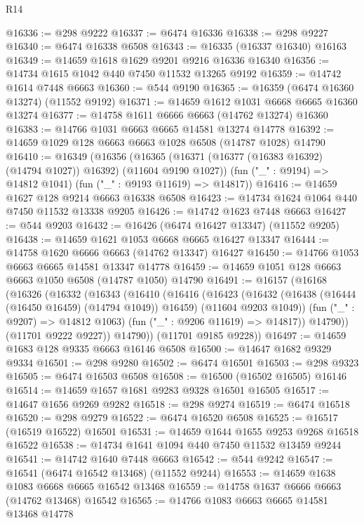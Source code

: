 \begin{lexlean}{R14}
\begin{coremodule}
{{{{{{{{{{{{{{{{{{{{{{{{{{{{{{{{{{{{{{{{{{{{{{{{{{{{{{{{{{{{{{{{{{{{{{{{{{{{{{{{{{@16336 := @298 @9222
@16337 := @6474 @16336
@16338 := @298 @9227
@16340 := @6474 @16338 @6508
@16343 := @16335 (@16337 @16340) @16163
@16349 := @14659 @1618 @1629 @9201 @9216 @16336 @16340
@16356 := @14734 @1615 @1042 @440 @7450 @11532 @13265 @9192
@16359 := @14742 @1614 @7448 @6663
@16360 := @544 @9190
@16365 := @16359 (@6474 @16360 @13274) (@11552 @9192)
@16371 := @14659 @1612 @1031 @6668 @6665 @16360 @13274
@16377 := @14758 @1611 @6666 @6663 (@14762 @13274) @16360
@16383 := @14766 @1031 @6663 @6665 @14581 @13274 @14778
@16392 := @14659 @1029 @128 @6663 @6663 @1028 @6508 (@14787 @1028) @14790
@16410 := @16349
    (@16356
      (@16365 (@16371 (@16377 (@16383 @16392) (@14794 @1027)) @16392) (@11604 @9190 @1027))
      (fun ("_" : @9194) => @14812 @1041)
      (fun ("_" : @9193 @11619) => @14817))
@16416 := @14659 @1627 @128 @9214 @6663 @16338 @6508
@16423 := @14734 @1624 @1064 @440 @7450 @11532 @13338 @9205
@16426 := @14742 @1623 @7448 @6663
@16427 := @544 @9203
@16432 := @16426 (@6474 @16427 @13347) (@11552 @9205)
@16438 := @14659 @1621 @1053 @6668 @6665 @16427 @13347
@16444 := @14758 @1620 @6666 @6663 (@14762 @13347) @16427
@16450 := @14766 @1053 @6663 @6665 @14581 @13347 @14778
@16459 := @14659 @1051 @128 @6663 @6663 @1050 @6508 (@14787 @1050) @14790
@16491 := @16157
    (@16168
      (@16326
        (@16332
          (@16343
            (@16410
              (@16416
                (@16423
                  (@16432
                    (@16438 (@16444 (@16450 @16459) (@14794 @1049)) @16459)
                    (@11604 @9203 @1049))
                  (fun ("_" : @9207) => @14812 @1063)
                  (fun ("_" : @9206 @11619) => @14817))
                @14790))
            (@11701 @9222 @9227))
          @14790))
      (@11701 @9185 @9228))
@16497 := @14659 @1683 @128 @9335 @6663 @16146 @6508
@16500 := @14647 @1682 @9329 @9334
@16501 := @298 @9280
@16502 := @6474 @16501
@16503 := @298 @9323
@16505 := @6474 @16503 @6508
@16508 := @16500 (@16502 @16505) @16146
@16514 := @14659 @1657 @1681 @9283 @9328 @16501 @16505
@16517 := @14647 @1656 @9269 @9282
@16518 := @298 @9274
@16519 := @6474 @16518
@16520 := @298 @9279
@16522 := @6474 @16520 @6508
@16525 := @16517 (@16519 @16522) @16501
@16531 := @14659 @1644 @1655 @9253 @9268 @16518 @16522
@16538 := @14734 @1641 @1094 @440 @7450 @11532 @13459 @9244
@16541 := @14742 @1640 @7448 @6663
@16542 := @544 @9242
@16547 := @16541 (@6474 @16542 @13468) (@11552 @9244)
@16553 := @14659 @1638 @1083 @6668 @6665 @16542 @13468
@16559 := @14758 @1637 @6666 @6663 (@14762 @13468) @16542
@16565 := @14766 @1083 @6663 @6665 @14581 @13468 @14778
}}}}}}}}}}}}}}}}}}}}}}}}}}}}}}}}}}}}}}}}}}}}}}}}}}}}}}}}}}}}}}}}}}}}}}}}}}}}}}}}}}
\end{coremodule}
\end{lexlean}
